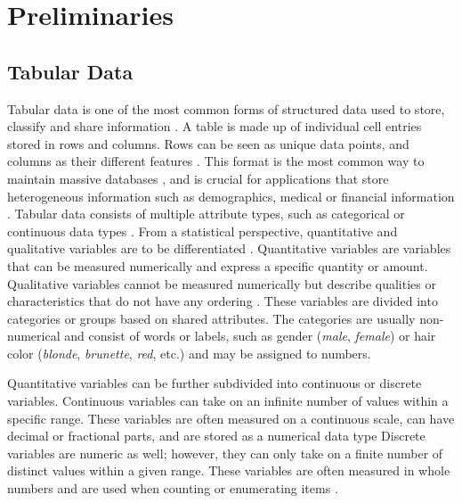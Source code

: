 \chapter{Preliminaries}
\label{ch:preliminaries}

\section{Tabular Data}
\label{ch:preliminaries-dataSynthesis-tabularData}

Tabular data is one of the most common forms of structured data \cite{hernandez2022SyntheticDataGeneration} used to store, classify and share information \cite{pilaluisa2022ContextualWordEmbeddings}.
A table is made up of individual cell entries stored in rows and columns.
Rows can be seen as unique data points, and columns as their different features \cite{borisov2022DeepNeuralNetworks, yoon2020VIMEExtendingSuccess}.
This format is the most common way to maintain massive databases \cite{esmaeilpour2022BidiscriminatorGANTabular, yoon2020VIMEExtendingSuccess}, and is crucial for applications that store heterogeneous information such as demographics, medical or financial information \cite{borisov2022DeepNeuralNetworks, yoon2020VIMEExtendingSuccess}.
Tabular data consists of multiple attribute types, such as categorical or continuous data types \cite{borisov2022DeepNeuralNetworks}.
From a statistical perspective, quantitative and qualitative variables are to be differentiated \cite{lane2003IntroductionStatistics}.
Quantitative variables are variables that can be measured numerically and express a specific quantity or amount. 
Qualitative variables cannot be measured numerically but describe qualities or characteristics that do not have any ordering  \cite{lane2003IntroductionStatistics}. 
These variables are divided into categories or groups based on shared attributes. 
The categories are usually non-numerical and consist of words or labels, such as gender (\textit{male}, \textit{female}) or hair color (\textit{blonde}, \textit{brunette}, \textit{red}, etc.) and may be assigned to numbers.

Quantitative variables can be further subdivided into continuous or discrete variables.
Continuous variables can take on an infinite number of values within a specific range. 
These variables are often measured on a continuous scale, can have decimal or fractional parts, and are stored as a numerical data type \cite{lane2003IntroductionStatistics, lederrey2022DATGANIntegratingExperta}
Discrete variables are numeric as well; however, they can only take on a finite number of distinct values within a given range. 
These variables are often measured in whole numbers and are used when counting or enumerating items \cite{lane2003IntroductionStatistics}.

